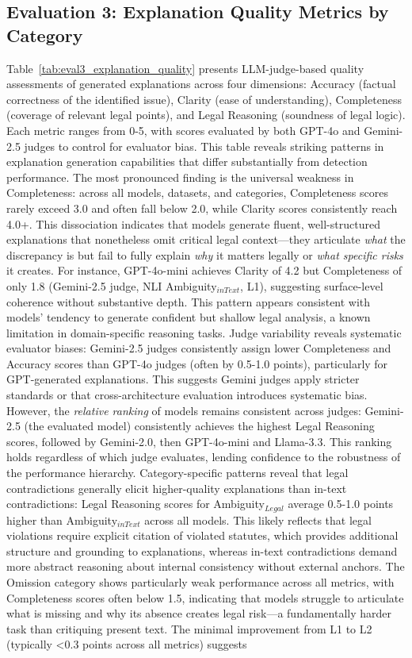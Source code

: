 \documentclass[11pt]{article}
\begin{document}
\subsection{Evaluation 3: Explanation Quality Metrics by Category}
\label{sec:appendix-eval3-explanation}

Table~\ref{tab:eval3_explanation_quality} presents LLM-judge-based quality assessments of generated explanations across four dimensions: Accuracy (factual correctness of the identified issue), Clarity (ease of understanding), Completeness (coverage of relevant legal points), and Legal Reasoning (soundness of legal logic). Each metric ranges from 0-5, with scores evaluated by both GPT-4o and Gemini-2.5 judges to control for evaluator bias. This table reveals striking patterns in explanation generation capabilities that differ substantially from detection performance. The most pronounced finding is the universal weakness in Completeness: across all models, datasets, and categories, Completeness scores rarely exceed 3.0 and often fall below 2.0, while Clarity scores consistently reach 4.0+. This dissociation indicates that models generate fluent, well-structured explanations that nonetheless omit critical legal context—they articulate \textit{what} the discrepancy is but fail to fully explain \textit{why} it matters legally or \textit{what specific risks} it creates. For instance, GPT-4o-mini achieves Clarity of 4.2 but Completeness of only 1.8 (Gemini-2.5 judge, NLI Ambiguity$_{inText}$, L1), suggesting surface-level coherence without substantive depth. This pattern appears consistent with models' tendency to generate confident but shallow legal analysis, a known limitation in domain-specific reasoning tasks. Judge variability reveals systematic evaluator biases: Gemini-2.5 judges consistently assign lower Completeness and Accuracy scores than GPT-4o judges (often by 0.5-1.0 points), particularly for GPT-generated explanations. This suggests Gemini judges apply stricter standards or that cross-architecture evaluation introduces systematic bias. However, the \textit{relative ranking} of models remains consistent across judges: Gemini-2.5 (the evaluated model) consistently achieves the highest Legal Reasoning scores, followed by Gemini-2.0, then GPT-4o-mini and Llama-3.3. This ranking holds regardless of which judge evaluates, lending confidence to the robustness of the performance hierarchy. Category-specific patterns reveal that legal contradictions generally elicit higher-quality explanations than in-text contradictions: Legal Reasoning scores for Ambiguity$_{Legal}$ average 0.5-1.0 points higher than Ambiguity$_{inText}$ across all models. This likely reflects that legal violations require explicit citation of violated statutes, which provides additional structure and grounding to explanations, whereas in-text contradictions demand more abstract reasoning about internal consistency without external anchors. The Omission category shows particularly weak performance across all metrics, with Completeness scores often below 1.5, indicating that models struggle to articulate what is missing and why its absence creates legal risk—a fundamentally harder task than critiquing present text. The minimal improvement from L1 to L2 (typically <0.3 points across all metrics) suggests 
\end{document}
